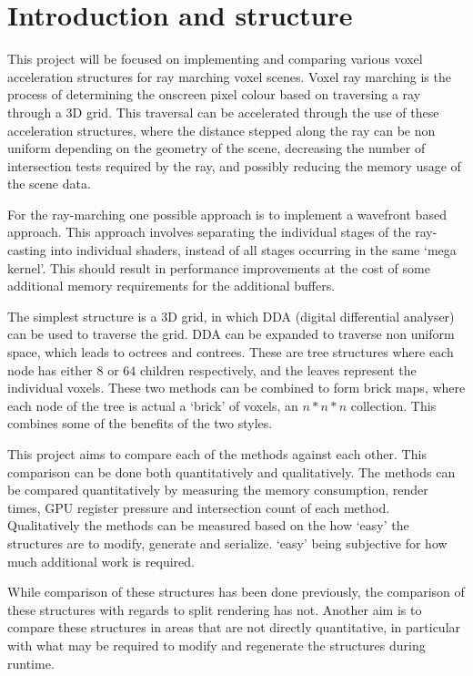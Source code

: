 \section*{Introduction and structure}

This project will be focused on implementing and comparing various
voxel acceleration structures for ray marching voxel scenes. Voxel
ray marching is the process of determining the onscreen pixel colour based
on traversing a ray through a 3D grid. This traversal can be accelerated through
the use of these acceleration structures, where the distance stepped along the
ray can be non uniform depending on the geometry of the scene,
decreasing the number of intersection tests required by the ray,
and possibly reducing the memory usage of the scene data.

For the ray-marching one possible approach is to implement a
wavefront\cite{laine2013wavefront} based approach. This approach
involves separating the individual stages of the ray-casting into individual
shaders, instead of all stages occurring in the same `mega kernel'. This should
result in performance improvements at the cost of some additional
memory requirements for the additional buffers.

The simplest structure is a 3D grid, in which DDA (digital
differential analyser)\cite{amanatides1987fast} can be used to
traverse the grid. DDA can be expanded to traverse non uniform space,
which leads to octrees\cite{laine2010svo} and contrees. These are
tree structures where each node has either $8$ or $64$ children
respectively, and the leaves represent the individual voxels. These
two methods can be combined to form brick
maps\cite{van2015brickmap}, where each node of the tree is actual
a `brick' of voxels, an $n*n*n$ collection. This combines some of the
benefits of the two styles.

This project aims to compare each of the methods against each other.
This comparison can be done both quantitatively and qualitatively.
The methods can be compared quantitatively by measuring the
memory consumption, render times, GPU register pressure and
intersection count of each method.
Qualitatively the methods can be measured based on the how `easy' the
structures are to modify, generate and serialize. `easy' being subjective
for how much additional work is required.

While comparison of these structures has been done previously, the comparison
of these structures with regards to split rendering has not. Another aim is to
compare these structures in areas that are not directly quantitative,
in particular with what may be required to modify and regenerate the structures
during runtime.

